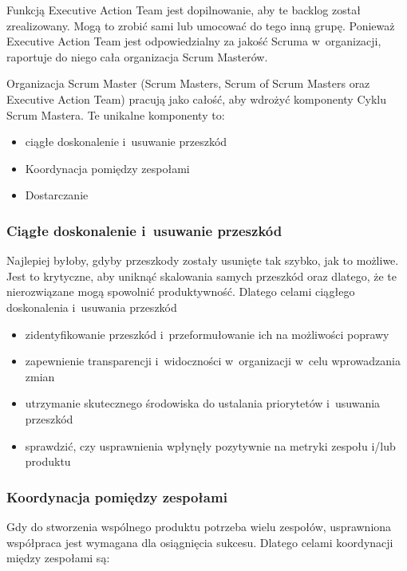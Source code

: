 \documentclass[12pt,a4paper,parskip=full]{scrartcl}
\begin{document}
Funkcją Executive Action Team jest dopilnowanie, aby te backlog został zrealizowany. Mogą to zrobić sami lub umocować do tego inną grupę. Ponieważ Executive Action Team jest odpowiedzialny za jakość Scruma w~organizacji, raportuje do niego cała organizacja Scrum Masterów.

Organizacja Scrum Master (Scrum Masters, Scrum of Scrum Masters oraz Executive Action Team) pracują jako całość, aby wdrożyć komponenty Cyklu Scrum Mastera. Te unikalne komponenty to:


\begin{itemize}
\itemsep1pt\parskip0pt
\item
  ciągłe doskonalenie i~usuwanie przeszkód
\item
  Koordynacja pomiędzy zespołami
\item
  Dostarczanie
\end{itemize}

\subsubsection{Ciągłe doskonalenie i~usuwanie przeszkód}\label{Continuous-improvement-and-impediment-removal}

Najlepiej byłoby, gdyby przeszkody zostały usunięte tak szybko, jak to możliwe. Jest to krytyczne, aby uniknąć skalowania samych przeszkód oraz dlatego, że te nierozwiązane mogą spowolnić produktywność. Dlatego celami ciągłego doskonalenia i~usuwania przeszkód

\begin{itemize}
\itemsep1pt\parskip0pt
\item
  zidentyfikowanie przeszkód i~przeformułowanie ich na możliwości poprawy
\item
  zapewnienie transparencji i~widoczności w~organizacji w~celu wprowadzania zmian
\item
  utrzymanie skutecznego środowiska do ustalania priorytetów i~usuwania przeszkód
\item
  sprawdzić, czy usprawnienia wpłynęły pozytywnie na metryki zespołu i/lub produktu
\end{itemize}

\subsubsection{Koordynacja pomiędzy zespołami}\label{cross-team-coordination}

Gdy do stworzenia wspólnego produktu potrzeba wielu zespołów,
usprawniona współpraca jest wymagana dla osiągnięcia sukcesu. Dlatego celami koordynacji między zespołami są:
\end{document}
